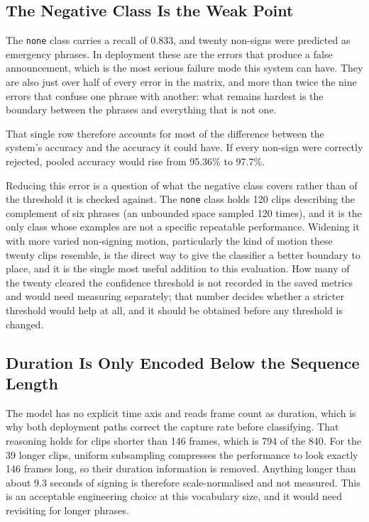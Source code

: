 \subsection{The Negative Class Is the Weak Point}

The \texttt{none} class carries a recall of 0.833, and twenty non-signs were predicted as emergency phrases. In deployment these are the errors that produce a false announcement, which is the most serious failure mode this system can have. They are also just over half of every error in the matrix, and more than twice the nine errors that confuse one phrase with another: what remains hardest is the boundary between the phrases and everything that is not one.

That single row therefore accounts for most of the difference between the system's accuracy and the accuracy it could have. If every non-sign were correctly rejected, pooled accuracy would rise from 95.36\% to 97.7\%.

Reducing this error is a question of what the negative class covers rather than of the threshold it is checked against. The \texttt{none} class holds 120 clips describing the complement of six phrases (an unbounded space sampled 120 times), and it is the only class whose examples are not a specific repeatable performance. Widening it with more varied non-signing motion, particularly the kind of motion these twenty clips resemble, is the direct way to give the classifier a better boundary to place, and it is the single most useful addition to this evaluation. How many of the twenty cleared the confidence threshold is not recorded in the saved metrics and would need measuring separately; that number decides whether a stricter threshold would help at all, and it should be obtained before any threshold is changed.

\subsection{Duration Is Only Encoded Below the Sequence Length}

The model has no explicit time axis and reads frame count as duration, which is why both deployment paths correct the capture rate before classifying. That reasoning holds for clips shorter than 146 frames, which is 794 of the 840. For the 39 longer clips, uniform subsampling compresses the performance to look exactly 146 frames long, so their duration information is removed. Anything longer than about 9.3 seconds of signing is therefore scale-normalised and not measured. This is an acceptable engineering choice at this vocabulary size, and it would need revisiting for longer phrases.

